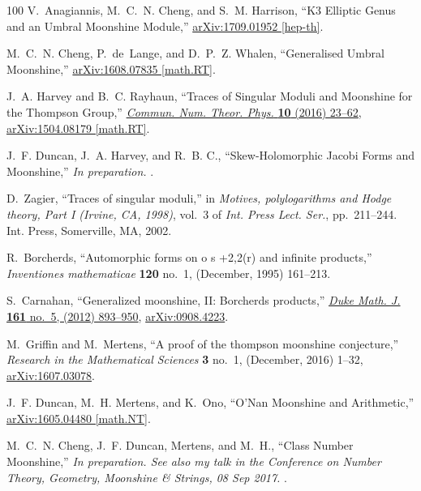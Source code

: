 \documentclass[11pt,a4paper,fontset=windows]{ctexart}
\numberwithin{equation}{section}
\begin{document}
\begin{thebibliography}{100}
V.~Anagiannis, M.~C.~N. Cheng, and S.~M. Harrison, ``{K3 Elliptic Genus and an
  Umbral Moonshine Module},''
\href{http://arxiv.org/abs/1709.01952}{{\ttfamily arXiv:1709.01952 [hep-th]}}.

M.~C.~N. Cheng, P.~de~Lange, and D.~P.~Z. Whalen, ``{Generalised Umbral
  Moonshine},''
\href{http://arxiv.org/abs/1608.07835}{{\ttfamily arXiv:1608.07835 [math.RT]}}.

J.~A. Harvey and B.~C. Rayhaun, ``{Traces of Singular Moduli and Moonshine for
  the Thompson Group},''
  \href{http://dx.doi.org/10.4310/CNTP.2016.v10.n1.a2}{{\em Commun. Num. Theor.
  Phys.} {\bfseries 10} (2016) 23--62},
\href{http://arxiv.org/abs/1504.08179}{{\ttfamily arXiv:1504.08179 [math.RT]}}.

J.~F. Duncan, J.~A. Harvey, and R.~B. C., ``{Skew-Holomorphic Jacobi Forms and
  Moonshine},'' {\em In preparation.} .

D.~Zagier, ``Traces of singular moduli,'' in {\em Motives, polylogarithms and
  {H}odge theory, {P}art {I} ({I}rvine, {CA}, 1998)}, vol.~3 of {\em Int. Press
  Lect. Ser.}, pp.~211--244.
\newblock Int. Press, Somerville, MA, 2002.

R.~Borcherds, ``Automorphic forms on o s +2,2(r) and infinite products,'' {\em
  Inventiones mathematicae} {\bfseries 120} no.~1, (December, 1995) 161--213.

S.~Carnahan, ``Generalized moonshine, {II}: {B}orcherds products,''
  \href{http://dx.doi.org/10.1215/00127094-1548416}{{\em Duke Math. J.}
  {\bfseries 161} no.~5, (2012) 893--950},
  \href{http://arxiv.org/abs/arXiv:0908.4223}{{\ttfamily arXiv:0908.4223}}.

M.~Griffin and M.~Mertens, ``A proof of the thompson moonshine conjecture,''
  {\em Research in the Mathematical Sciences} {\bfseries 3} no.~1, (December,
  2016) 1--32, \href{http://arxiv.org/abs/arXiv:1607.03078}{{\ttfamily
  arXiv:1607.03078}}.

J.~F. Duncan, M.~H. Mertens, and K.~Ono, ``{O'Nan Moonshine and Arithmetic},''
  \href{http://arxiv.org/abs/1605.04480}{{\ttfamily arXiv:1605.04480
  [math.NT]}}.

M.~C.~N. Cheng, J.~F. Duncan, Mertens, and M.~H., ``{Class Number Moonshine},''
  {\em In preparation. See also my talk in the Conference on Number Theory,
  Geometry, Moonshine \& Strings, 08 Sep 2017.} .


\end{thebibliography}
\end{document}
